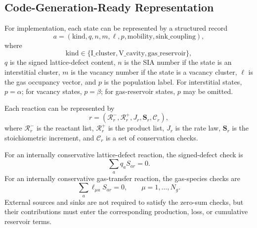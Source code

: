 \subsection{Code-Generation-Ready Representation}
\label{sec:code_generation_ready_representation}

For implementation, each state can be represented by a structured record
\begin{equation}
    a
    =
    \left(
    \mathrm{kind},
    q,
    n,
    m,
    \boldsymbol{\ell},
    p,
    \mathrm{mobility},
    \mathrm{sink\_coupling}
    \right),
    \label{eq:state_record}
\end{equation}
where
\begin{equation}
    \mathrm{kind}
    \in
    \{\mathrm{I\_cluster},\mathrm{V\_cavity},\mathrm{gas\_reservoir}\},
\end{equation}
$q$ is the signed lattice-defect content, $n$ is the SIA number if the state is
an interstitial cluster, $m$ is the vacancy number if the state is a vacancy
cluster, $\boldsymbol{\ell}$ is the gas occupancy vector, and $p$ is the
population label. For interstitial states, $p=\alpha$; for vacancy states,
$p=\beta$; for gas-reservoir states, $p$ may be omitted.

Each reaction can be represented by
\begin{equation}
    r
    =
    \left(
    \mathcal{R}^-_r,
    \mathcal{R}^+_r,
    J_r,
    \mathbf{S}_r,
    \mathcal{C}_r
    \right),
    \label{eq:reaction_record}
\end{equation}
where $\mathcal{R}^-_r$ is the reactant list, $\mathcal{R}^+_r$ is the product
list, $J_r$ is the rate law, $\mathbf{S}_r$ is the stoichiometric increment,
and $\mathcal{C}_r$ is a set of conservation checks.

For an internally conservative lattice-defect reaction, the signed-defect
check is
\begin{equation}
    \sum_a q_a S_{ar}=0 .
    \label{eq:code_signed_defect_check}
\end{equation}
For an internally conservative gas-transfer reaction, the gas-species checks
are
\begin{equation}
    \sum_a \ell_{\mu a} S_{ar}=0,
    \qquad
    \mu=1,\ldots,N_g .
    \label{eq:code_gas_check}
\end{equation}
External sources and sinks are not required to satisfy the zero-sum checks, but
their contributions must enter the corresponding production, loss, or
cumulative reservoir terms.

